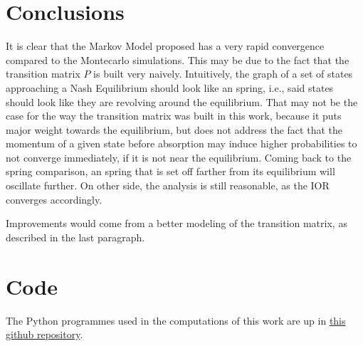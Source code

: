\documentclass{article}
\begin{document}
\section{Conclusions}\label{sec5}
It is clear that the Markov Model proposed has a very rapid convergence compared to the Montecarlo simulations. This may be due to the fact that the transition matrix $P$ is built very naively. Intuitively, the graph of a set of states approaching a Nash Equilibrium should look like an spring, i.e., said states should look like they are revolving around the equilibrium. That may not be the case for the way the transition matrix was built in this work, because it puts major weight towards the equilibrium, but does not address the fact that the momentum of a given state before absorption may induce higher probabilities to not converge immediately, if it is not near the equilibrium. Coming back to the spring comparison, an spring that is set off farther from its equilibrium will oscillate further. On other side, the analysis is still reasonable, as the IOR converges accordingly.\par
Improvements would come from a better modeling of the transition matrix, as described in the last paragraph.\par 

\section*{Code}
The Python programmes used in the computations of this work are up in \href{https://github.com/NeutralElement/Stochastic-Processes-Project}{this github repository}.








\end{document}

